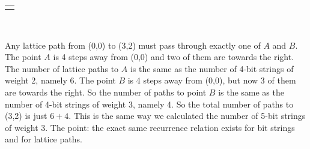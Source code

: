\documentclass[10pt,]{book}
\theoremstyle{plain}
\theoremstyle{definition}
\theoremstyle{definition}
\theoremstyle{definition}
\theoremstyle{definition}
\numberwithin{equation}{chapter}
\newlength{\panelmax}
\begin{document}
{%
\setlength{\panelmax}{0pt}
\ifdefined\panelboxAimage\else\newsavebox{\panelboxAimage}\fi%
\begin{lrbox}{\panelboxAimage}
\end{lrbox}
\ifdefined\phAimage\else\newlength{\phAimage}\fi%
\setlength{\phAimage}{\ht\panelboxAimage+\dp\panelboxAimage}
\settototalheight{\phAimage}{\usebox{\panelboxAimage}}
\setlength{\panelmax}{\maxof{\panelmax}{\phAimage}}
\leavevmode%
\setlength{\tabcolsep}{0\linewidth}
\par\medskip\noindent
\hspace*{0.3\linewidth}%
\begin{tabular}{@{}*{1}{c}@{}}
\begin{minipage}[c][\panelmax][t]{0.4\linewidth}\usebox{\panelboxAimage}\end{minipage}\end{tabular}\\
}%
\par
\hypertarget{p-814}{}%
Any lattice path from (0,0) to (3,2) must pass through exactly one of \(A\) and \(B\). The point \(A\) is 4 steps away from (0,0) and two of them are towards the right. The number of lattice paths to \(A\) is the same as the number of 4-bit strings of weight 2, namely 6. The point \(B\) is 4 steps away from (0,0), but now 3 of them are towards the right. So the number of paths to point \(B\) is the same as the number of 4-bit strings of weight 3, namely 4. So the total number of paths to (3,2) is just \(6+4\). This is the same way we calculated the number of 5-bit strings of weight 3. The point: the exact same recurrence relation exists for bit strings and for lattice paths.%
\typeout{************************************************}
\typeout{************************************************}
\end{document}
